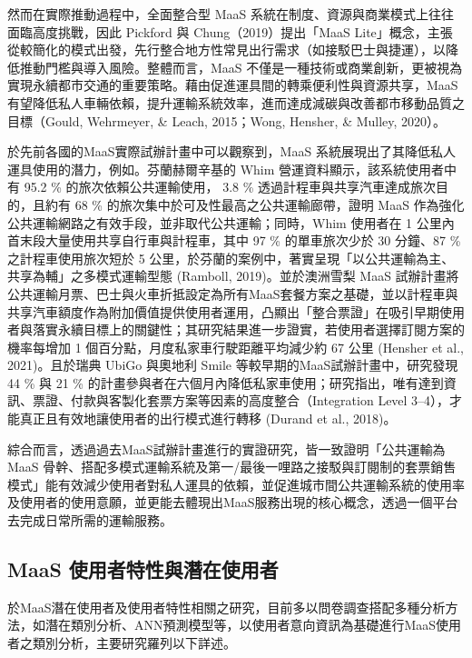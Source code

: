 然而在實際推動過程中，全面整合型 MaaS
系統在制度、資源與商業模式上往往面臨高度挑戰，因此 Pickford 與
Chung（2019）提出「MaaS
Lite」概念，主張從較簡化的模式出發，先行整合地方性常見出行需求（如接駁巴士與捷運），以降低推動門檻與導入風險。整體而言，MaaS
不僅是一種技術或商業創新，更被視為實現永續都市交通的重要策略。藉由促進運具間的轉乘便利性與資源共享，MaaS
有望降低私人車輛依賴，提升運輸系統效率，進而達成減碳與改善都市移動品質之目標（Gould,
Wehrmeyer, \& Leach, 2015；Wong, Hensher, \& Mulley, 2020）。

於先前各國的MaaS實際試辦計畫中可以觀察到，MaaS
系統展現出了其降低私人運具使用的潛力，例如。芬蘭赫爾辛基的 Whim
營運資料顯示，該系統使用者中有 95.2 \% 的旅次依賴公共運輸使用， 3.8 \%
透過計程車與共享汽車達成旅次目的，且約有 68 \%
的旅次集中於可及性最高之公共運輸廊帶，證明 MaaS
作為強化公共運輸網路之有效手段，並非取代公共運輸；同時，Whim 使用者在 1
公里內首末段大量使用共享自行車與計程車，其中 97 \% 的單車旅次少於 30
分鐘、87 \% 之計程車使用旅次短於 5
公里，於芬蘭的案例中，著實呈現「以公共運輸為主、共享為輔」之多模式運輸型態
(Ramboll, 2019)。並於澳洲雪梨 MaaS
試辦計畫將公共運輸月票、巴士與火車折抵設定為所有MaaS套餐方案之基礎，並以計程車與共享汽車額度作為附加價值提供使用者運用，凸顯出「整合票證」在吸引早期使用者與落實永續目標上的關鍵性；其研究結果進一步證實，若使用者選擇訂閱方案的機率每增加
1 個百分點，月度私家車行駛距離平均減少約 67 公里 (Hensher et al.,
2021)。且於瑞典 UbiGo 與奧地利 Smile 等較早期的MaaS試辦計畫中，研究發現
44 \% 與 21 \%
的計畫參與者在六個月內降低私家車使用；研究指出，唯有達到資訊、票證、付款與客製化套票方案等因素的高度整合（Integration
Level 3--4），才能真正且有效地讓使用者的出行模式進行轉移 (Durand et al.,
2018)。

綜合而言，透過過去MaaS試辦計畫進行的實證研究，皆一致證明「公共運輸為
MaaS
骨幹、搭配多模式運輸系統及第一/最後一哩路之接駁與訂閱制的套票銷售模式」能有效減少使用者對私人運具的依賴，並促進城市間公共運輸系統的使用率及使用者的使用意願，並更能去體現出MaaS服務出現的核心概念，透過一個平台去完成日常所需的運輸服務。

\subsection{MaaS
使用者特性與潛在使用者}\label{maas-ux4f7fux7528ux8005ux7279ux6027ux8207ux6f5bux5728ux4f7fux7528ux8005}

於MaaS潛在使用者及使用者特性相關之研究，目前多以問卷調查搭配多種分析方法，如潛在類別分析、ANN預測模型等，以使用者意向資訊為基礎進行MaaS使用者之類別分析，主要研究羅列以下詳述。

